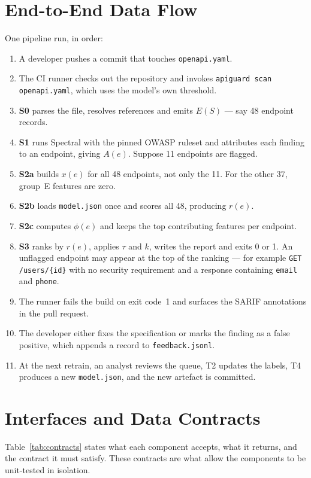 \documentclass[conference]{IEEEtran}
\begin{document}
\section{End-to-End Data Flow}
One pipeline run, in order:

\begin{enumerate}
\item A developer pushes a commit that touches \texttt{openapi.yaml}.
\item The CI runner checks out the repository and invokes
\texttt{apiguard scan openapi.yaml}, which uses the model's own threshold.
\item \textbf{S0} parses the file, resolves references and emits $E(S)$ --- say 48 endpoint
records.
\item \textbf{S1} runs Spectral with the pinned OWASP ruleset and attributes each finding to
an endpoint, giving $A(e)$. Suppose 11 endpoints are flagged.
\item \textbf{S2a} builds $x(e)$ for all 48 endpoints, not only the 11. For the other 37,
group~E features are zero.
\item \textbf{S2b} loads \texttt{model.json} once and scores all 48, producing $r(e)$.
\item \textbf{S2c} computes $\phi(e)$ and keeps the top contributing features per endpoint.
\item \textbf{S3} ranks by $r(e)$, applies $\tau$ and $k$, writes the report and exits 0 or
1. An unflagged endpoint may appear at the top of the ranking --- for example
\texttt{GET /users/\{id\}} with no security requirement and a response containing
\texttt{email} and \texttt{phone}.
\item The runner fails the build on exit code~1 and surfaces the SARIF annotations in the
pull request.
\item The developer either fixes the specification or marks the finding as a false positive,
which appends a record to \texttt{feedback.jsonl}.
\item At the next retrain, an analyst reviews the queue, T2 updates the labels, T4 produces a
new \texttt{model.json}, and the new artefact is committed.
\end{enumerate}

\section{Interfaces and Data Contracts}
Table~\ref{tab:contracts} states what each component accepts, what it returns, and the
contract it must satisfy. These contracts are what allow the components to be unit-tested in
isolation.
\end{document}
